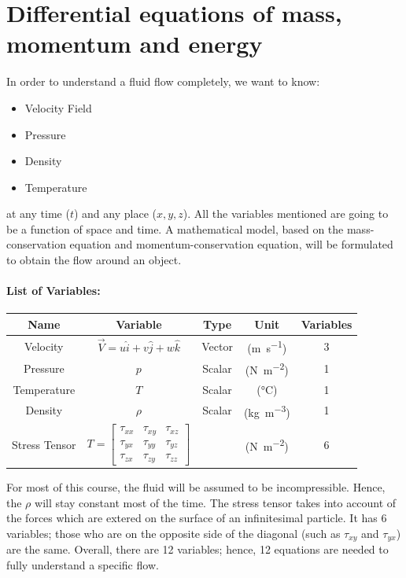 \chapter{Differential equations of mass, momentum and energy}
In order to understand a fluid flow completely, we want to know:
\begin{itemize}[noitemsep]
  \item Velocity Field
  \item Pressure
  \item Density
  \item Temperature
\end{itemize}
at any time ($t$) and any place ($x,y,z$). All the variables mentioned are going to be a function of space and time. A mathematical model, based on the mass-conservation equation and momentum-conservation equation, will be formulated to obtain the flow around an object.
\subsubsection{List of Variables:}
\begin{center}
  \begin{tabular}{ |c|c|c|c|c| }
    \hline
    Name          & Variable                                      & Type   & Unit                             & Variables \\
    \hline
    Velocity      & $\vec{V} = u\hat{i}+v\hat{j}+w\hat{k}$        & Vector & (\si{\meter\per\second})         & 3         \\
    \hline
    Pressure      & $p$                                           & Scalar & (\si{\newton\per\meter\squared}) & 1         \\
    \hline
    Temperature   & $T$                                           & Scalar & (\si{\celsius})                  & 1         \\
    \hline
    Density       & $\rho$                                        & Scalar & (\si{\kilogram\per\meter\cubed}) & 1         \\
    \hline
    Stress Tensor & $T = \left[ \begin{array}{ccc} \tau_{xx} & \tau_{xy} & \tau_{xz} \\ \tau_{yx} & \tau_{yy} & \tau_{yz} \\ \tau_{zx} & \tau_{zy} & \tau_{zz} \end{array}\right]$ &        & (\si{\newton\per\meter\squared}) & 6         \\
    \hline
  \end{tabular}
\end{center}
For most of this course, the fluid will be assumed to be incompressible. Hence, the $\rho$ will stay constant most of the time. The stress tensor takes into account of the forces which are extered on the surface of an infinitesimal particle. It has 6 variables; those who are on the opposite side of the diagonal (such as $\tau_{xy}$ and $\tau_{yx}$) are the same. Overall, there are 12 variables; hence, 12 equations are needed to fully understand a specific flow.
